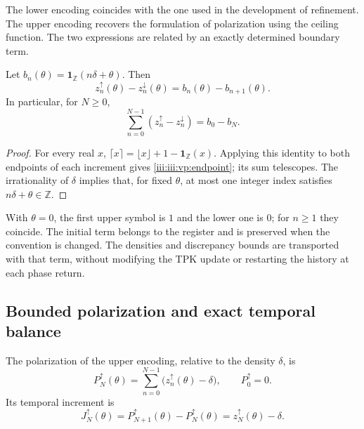 The lower encoding coincides with the one used in the development
of refinement. The upper encoding recovers the formulation of
polarization using the ceiling function. The two expressions are related
by an exactly determined boundary term.

\begin{proposition}
Let $b_n(\theta)=\mathbf1_{\mathbb Z}(n\delta+\theta)$. Then
\begin{equation}
 z_n^{\uparrow}(\theta)-z_n^{\downarrow}(\theta)
 =b_n(\theta)-b_{n+1}(\theta).
 \label{iii:iii:vp:endpoint}
\end{equation}
In particular, for $N\geq0$,
\[
 \sum_{n=0}^{N-1}(z_n^{\uparrow}-z_n^{\downarrow})
 =b_0-b_N.
\]
\end{proposition}
\begin{proof}
For every real $x$, $\lceil x\rceil=\lfloor x\rfloor+1-
\mathbf1_{\mathbb Z}(x)$. Applying this identity to both endpoints
of each increment gives \eqref{iii:iii:vp:endpoint}; its sum telescopes.
The irrationality of $\delta$ implies that, for fixed $\theta$, at most
one integer index satisfies $n\delta+\theta\in\mathbb Z$.
\end{proof}

With $\theta=0$, the first upper symbol is $1$ and the lower one is $0$;
for $n\geq1$ they coincide. The initial term belongs to the register and is
preserved when the convention is changed. The densities and discrepancy
bounds are transported with that term, without modifying the TPK update
or restarting the history at each phase return.

\subsection{Bounded polarization and exact temporal balance}

\begin{definition}
The polarization of the upper encoding, relative to the density
$\delta$, is
\begin{equation}
 P_N^{\uparrow}(\theta)
 =\sum_{n=0}^{N-1}\bigl(z_n^{\uparrow}(\theta)-\delta\bigr),
 \qquad P_0^{\uparrow}=0.
 \label{iii:iii:vp:polarization}
\end{equation}
Its temporal increment is
\begin{equation}
 J_N^{\uparrow}(\theta)
 =P_{N+1}^{\uparrow}(\theta)-P_N^{\uparrow}(\theta)
 =z_N^{\uparrow}(\theta)-\delta.
 \label{iii:iii:vp:current}
\end{equation}
\end{definition}

